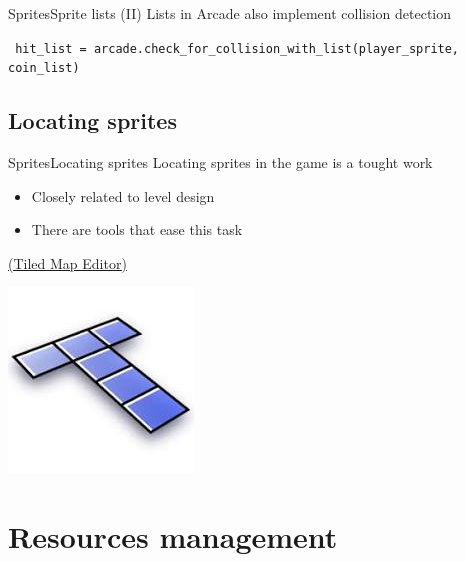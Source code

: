 \documentclass[10pt,compress]{beamer} %
\begin{document}
\begin{frame}{Sprites}{Sprite lists (II)}
    Lists in Arcade also implement collision detection 
	\begin{exampleblock}{}
        \texttt{
            hit\_list = arcade.check\_for\_collision\_with\_list(player\_sprite,
                                                              coin\_list)
        }
    \end{exampleblock}

\end{frame}

\subsection{Locating sprites}

\begin{frame}{Sprites}{Locating sprites}
    Locating sprites in the game is a tought work
    \begin{itemize}
        \item Closely related to \alert{level design}
        \item There are tools that ease this task
    \end{itemize}
    \href{https://www.mapeditor.org/}{(Tiled Map Editor)}

	\vspace{-2.5cm}
    \hfill \includegraphics[width=0.3\linewidth]{figs/tiled}
\end{frame}

\section{Resources management}
\end{document}
